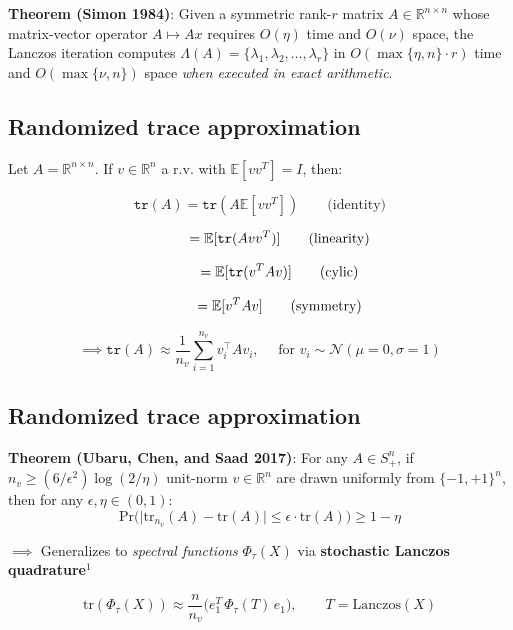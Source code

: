 \documentclass[
  letterpaper,
  DIV=11,
  numbers=noendperiod,
  oneside]{scrartcl}
\begin{document}
\textbf{Theorem (Simon 1984)}: Given a symmetric rank-\(r\) matrix
\(A \in \mathbb{R}^{n \times n}\) whose matrix-vector operator
\(A \mapsto A x\) requires \(O(\eta)\) time and \(O(\nu)\) space, the
Lanczos iteration computes
\(\Lambda(A) = \{ \lambda_1, \lambda_2, \dots, \lambda_r \}\) in
\(O(\max\{\eta, n\}\cdot r)\) time and \(O(\max\{\nu, n\})\) space
\emph{when executed in exact arithmetic}.

\subsection{Randomized trace
approximation}\label{randomized-trace-approximation}

Let \(A = \mathbb{R}^{n \times n}\). If \(v \in \mathbb{R}^n\) a
\(\mathrm{r.v.}\) with \(\mathbb{E}[vv^T] = I\), then:

\[ \mathtt{tr}(A) = \mathtt{tr}(A \mathbb{E}[v v^T]) \quad\quad \text{(identity)} \]

\[ \hphantom{\mathtt{tr}(A)} = \mathbb{E}[\mathtt{tr}(Avv^T)] \quad\quad \text{(linearity)} \]

\[ \hphantom{\mathtt{tr}(A)} = \mathbb{E}[\mathtt{tr}(v^T A v)] \quad\quad \text{(cylic)}\]

\[ \hphantom{\mathtt{tr}(A)} = \mathbb{E}[v^T A v] \quad\quad \text{(symmetry)}\]

\[
\implies \mathtt{tr}(A) \approx \frac{1}{n_v}\sum\limits_{i=1}^{n_v} v_i^\top A v_i, \quad \text{ for } v_i \sim \mathcal{N}(\mu=0, \sigma = 1)
\]

\subsection{Randomized trace
approximation}\label{randomized-trace-approximation-1}

\textbf{Theorem (Ubaru, Chen, and Saad 2017)}: For any \(A \in S_+^n\),
if \(n_v \geq (6/\epsilon^2) \log(2/\eta)\) unit-norm
\(v \in \mathbb{R}^n\) are drawn uniformly from \(\{-1, +1\}^n\), then
for any \(\epsilon, \eta \in (0,1)\):
\[ \mathrm{Pr}\bigg(\lvert \mathrm{tr}_{n_v}(A) - \mathrm{tr}(A) \rvert \leq \epsilon \cdot \mathrm{tr}(A) \bigg) \geq 1 - \eta\]

\(\implies\) Generalizes to \emph{spectral functions} \(\Phi_\tau(X)\)
via \textbf{stochastic Lanczos quadrature}\(^1\)

\[ \mathrm{tr}(\Phi_\tau(X)) \approx \frac{n}{n_v} \bigg( e_1^T \, \Phi_{\tau}(T) \, e_1 \bigg ), \quad \quad T = \mathrm{Lanczos}(X) \]
\end{document}
